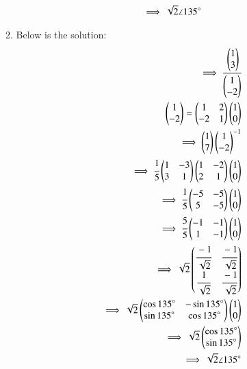 \begin{enumerate}[label=\thesection.\arabic*.,ref=\thesection.\theenumi]
\begin{enumerate}
\begin{align}
    \implies \sqrt{2} \angle 135 \degree
\end{align}
\item Below is the solution:
\begin{align}
    \implies \cfrac{\begin{pmatrix}1 \\ 3\end{pmatrix}}{\begin{pmatrix}1 \\ -2\end{pmatrix}}
\\
    \begin{pmatrix}1 \\ -2\end{pmatrix} = \begin{pmatrix}1 & 2\\-2 & 1\end{pmatrix}\begin{pmatrix}1 \\ 0\end{pmatrix}
\\
    \implies \begin{pmatrix}1 \\ 7\end{pmatrix}\begin{pmatrix}1\\-2\end{pmatrix}^{-1}
\\
    \implies \cfrac{1}{5}\begin{pmatrix}1 & -3\\3 & 1\end{pmatrix}\begin{pmatrix}1 & -2\\2 & 1\end{pmatrix}\begin{pmatrix}1 \\ 0\end{pmatrix}
\\
    \implies \cfrac{1}{5}\begin{pmatrix}-5 & -5\\5 & -5\end{pmatrix}\begin{pmatrix}1 \\ 0\end{pmatrix}
\\
    \implies \cfrac{5}{5}\begin{pmatrix}-1 & -1\\1 & -1\end{pmatrix}\begin{pmatrix}1 \\ 0\end{pmatrix}
\\
    \implies \sqrt{2}\begin{pmatrix}\cfrac{-1}{\sqrt{2}} & \cfrac{-1}{\sqrt{2}} \\ \cfrac{1}{\sqrt{2}} & \cfrac{-1}{\sqrt{2}}\end{pmatrix}
\\
    \implies \sqrt{2}\begin{pmatrix}\cos{135}\degree & -\sin{135}\degree\\ \sin{135}\degree & \cos{135}\degree\end{pmatrix}\begin{pmatrix}1 \\ 0\end{pmatrix}
\\
    \implies \sqrt{2}\begin{pmatrix}\cos{135}\degree \\ \sin{135}\degree\end{pmatrix}
\\
    \implies \sqrt{2} \angle 135 \degree
\end{align}
\end{enumerate}
\end{enumerate}


